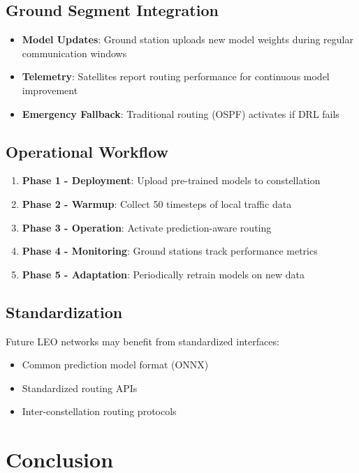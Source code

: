 \subsection{Ground Segment Integration}

\begin{itemize}
\item \textbf{Model Updates}: Ground station uploads new model weights during regular communication windows
\item \textbf{Telemetry}: Satellites report routing performance for continuous model improvement
\item \textbf{Emergency Fallback}: Traditional routing (OSPF) activates if DRL fails
\end{itemize}

\subsection{Operational Workflow}

\begin{enumerate}
\item \textbf{Phase 1 - Deployment}: Upload pre-trained models to constellation
\item \textbf{Phase 2 - Warmup}: Collect 50 timesteps of local traffic data
\item \textbf{Phase 3 - Operation}: Activate prediction-aware routing
\item \textbf{Phase 4 - Monitoring}: Ground stations track performance metrics
\item \textbf{Phase 5 - Adaptation}: Periodically retrain models on new data
\end{enumerate}

\subsection{Standardization}

Future LEO networks may benefit from standardized interfaces:
\begin{itemize}
\item Common prediction model format (ONNX)
\item Standardized routing APIs
\item Inter-constellation routing protocols
\end{itemize}

\section{Conclusion}


